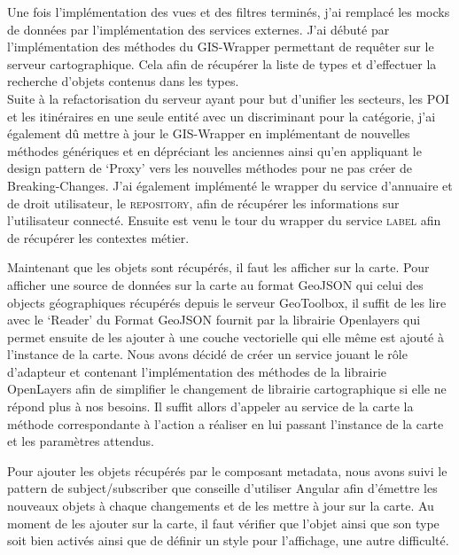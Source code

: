 \documentclass{rapportUHA40}
\begin{document}
Une fois l'implémentation des vues et des filtres terminés, j'ai remplacé les
mocks de données par l'implémentation des services externes. J'ai débuté par
l'implémentation des méthodes du GIS-Wrapper permettant de requêter sur le
serveur cartographique. Cela afin de récupérer la liste de types et d'effectuer
la recherche d'objets contenus dans les types. \\

Suite à la refactorisation du serveur ayant pour but d'unifier les secteurs,
les POI et les itinéraires en une seule entité avec un discriminant pour la
catégorie, j'ai également dû mettre à jour le GIS-Wrapper en implémentant de
nouvelles méthodes génériques et en dépréciant les anciennes ainsi qu'en
appliquant le design pattern de `Proxy' vers les nouvelles méthodes pour ne pas
créer de Breaking-Changes. J'ai également implémenté le wrapper du service
d'annuaire et de droit utilisateur, le \textsc{repository}, afin de récupérer
les informations sur l'utilisateur connecté. Ensuite est venu le tour du
wrapper du service \textsc{label} afin de récupérer les contextes métier.

Maintenant que les objets sont récupérés, il faut les afficher sur la carte.
Pour afficher une source de données sur la carte au format GeoJSON qui celui
des objects géographiques récupérés depuis le serveur GeoToolbox, il suffit de
les lire avec le `Reader' du Format GeoJSON fournit par la librairie Openlayers
qui permet ensuite de les ajouter à une couche vectorielle qui elle même est
ajouté à l'instance de la carte. Nous avons décidé de créer un service jouant
le rôle d'adapteur et contenant l'implémentation des méthodes de la librairie
OpenLayers afin de simplifier le changement de librairie cartographique si elle
ne répond plus à nos besoins. Il suffit allors d'appeler au service de la carte
la méthode correspondante à l'action a réaliser en lui passant l'instance de la
carte et les paramètres attendus.

Pour ajouter les objets récupérés par le composant metadata, nous avons suivi
le pattern de subject/subscriber que conseille d'utiliser Angular afin
d'émettre les nouveaux objets à chaque changements et de les mettre à jour sur
la carte. Au moment de les ajouter sur la carte, il faut vérifier que l'objet
ainsi que son type soit bien activés ainsi que de définir un style pour
l'affichage, une autre difficulté.
\end{document}
